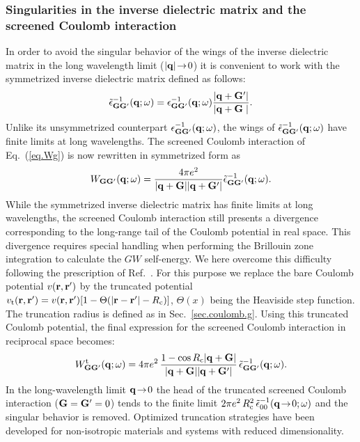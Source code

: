 \documentclass[twocolumn,prb,showpacs,superscriptaddress]{revtex4}
\def\w{\omega}
\def\q{{\bf q}}
\def\G{{\bf G}}
\def\Gp{{\bf G^\prime}}
\def\r{{\bf r}}
\def\rp{{\bf r^\prime}}
\begin{document}
\subsubsection{Singularities in the inverse dielectric matrix and the screened Coulomb interaction}

In order to avoid the singular behavior of the wings of the inverse dielectric matrix 
in the long wavelength limit ($|\q|\!\rightarrow\!0$) it is convenient to work with
the symmetrized inverse dielectric matrix defined as follows:\cite{balde_tosa}
  \begin{equation}
  \tilde\epsilon^{-1}_{\G\Gp}(\q;\w) = \epsilon^{-1}_{\G\Gp}(\q;\w)  \frac{|\q+\Gp|}{|\q+\G\phantom{^\prime}|}.
  \end{equation}
Unlike its unsymmetrized counterpart $\epsilon^{-1}_{\G\Gp}(\q;\w)$,
the wings of $\tilde\epsilon^{-1}_{\G\Gp}(\q;\w)$ have finite limits 
at long wavelengths.
The screened Coulomb interaction of Eq.\ (\ref{eq.Wg}) is now rewritten in symmetrized form
as
  \begin{equation}\label{eq.Wg_symm}
  W_{\G\Gp}(\q;\w) = \frac{4\pi e^2}{|\q+\G||\q+\Gp|}  \tilde\epsilon^{-1}_{\G\Gp}(\q;\w).
  \end{equation}
While the symmetrized inverse dielectric matrix has finite limits at long wavelengths,
the screened Coulomb interaction still presents a divergence corresponding to the
long-range tail of the Coulomb potential in real space. This divergence requires special
handling when performing the Brillouin zone integration to calculate 
the $GW$ self-energy.\cite{hl86}
We here overcome this difficulty following the prescription of
Ref.~. For this purpose we replace
the bare Coulomb potential $v(\r,\rp)$ by the truncated potential 
$v_{\rm t}(\r,\rp)=v(\r,\rp)[1-\Theta(|\r-\rp|-R_{\rm c})]$, 
$\Theta(x)$ being the Heaviside step function.
The truncation radius is defined as in Sec.\ \ref{sec.coulomb.g}. 
Using this truncated Coulomb potential, the final expression for the screened 
Coulomb interaction in reciprocal space becomes:
  \begin{equation}
  W^{\rm t}_{\G\Gp}(\q;\w) = 4\pi e^2 \, \frac{1-\cos{R_{\rm c}|\q+\G|}}{|\q+\G||\q+\Gp|}\,
     \tilde\epsilon^{-1}_{\G\Gp}(\q;\w).
  \end{equation}
In the long-wavelength limit $\q\!\rightarrow\!0$ the head 
of the truncated screened Coulomb interaction ($\G=\Gp=0$) tends to
the finite limit 
$2\pi e^2 \, R_{\rm c}^2 \, \tilde\epsilon^{-1}_{00}(\q\!\rightarrow\!0;\w)$
and the singular behavior is removed.
Optimized truncation strategies have been developed for non-isotropic materials
and systems with reduced dimensionality.\cite{sohrab}
\end{document}

